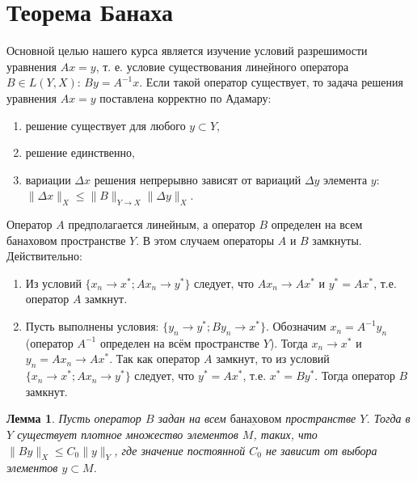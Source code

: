 \documentclass[12pt,a4paper,titlepage, oneside]{book}
\theoremstyle{definition}
\theoremstyle{plain}
\theoremstyle{remark}
\theoremstyle{remark}
\theoremstyle{remark}
\theoremstyle{plain}
\newtheorem*{lemma}{Лемма}
\theoremstyle{plain}
\begin{document}
\section{Теорема Банаха}
Основной целью нашего курса является изучение условий разрешимости уравнения $Ax=y$, т. е. условие существования $\underbar {линейного}$ оператора $B\in L(Y, X)$: $By=A^{-1}x$. Если такой оператор существует, то задача решения уравнения $Ax=y$ поставлена корректно по Адамару:
\begin{enumerate}
	\item решение существует для любого $y \subset Y$,
	\item решение единственно,
	\item вариации $\Delta x$ решения непрерывно зависят от вариаций $\Delta y$ элемента $y$: $\lVert \Delta x\rVert_X \leq \lVert B\rVert_{Y\to X}\lVert \Delta y\rVert_X$.
\end{enumerate}
Оператор $A$ предполагается линейным, а оператор $B$ определен на всем банаховом пространстве $Y$. В этом случаем операторы $A$ и $B$ замкнуты. Действительно:
\begin{enumerate}

	\item Из условий $\{x_n \to x^{*};Ax_n \to y^{*}\}$ следует, что $Ax_n \to Ax^{*}$ и $y^{*}=Ax^{*}$, т.е. оператор $A$ замкнут.

	\item Пусть выполнены условия: $\{y_n \to y^{*}; By_n \to x^{*}\}$. Обозначим $x_n=A^{-1}y_n$ (оператор $A^{-1}$ определен на всём пространстве $Y$). Тогда $x_n \to x^{*}$ и $y_n=Ax_n \to Ax^{*}$. Так как оператор $A$ замкнут, то из условий $\{x_n \to x^{*};Ax_n \to y^{*}\}$ следует, что $y^{*}=Ax^{*}$, т.е. $x^{*}=By^{*}$. Тогда оператор $B$ замкнут.
	
\end{enumerate}
	
\begin{lemma}
Пусть оператор $B$ задан на всем $\underbar {банаховом}$ пространстве $Y$. Тогда в $Y$ существует плотное множество элементов $M$, таких, что $\lVert By\rVert_X \leq C_0\lVert y\rVert_Y $, где значение постоянной $C_0$ не зависит от выбора элементов $y \subset M$.
\end{lemma}
\end{document}
